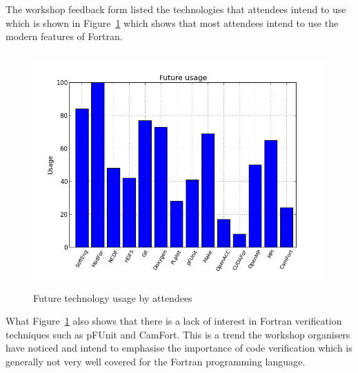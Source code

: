 \documentclass[12pt]{article}
\begin{document}
The workshop feedback form listed the technologies that attendees intend to use which is shown in Figure~\ref{future:png}
which shows that most attendees intend to use the modern features of Fortran.
\begin{figure}[H]
\begin{center}
\includegraphics[width=13cm,height=9cm]{future.png}
\caption{Future technology usage by attendees}\label{future:png}
\end{center}
\end{figure}
What Figure~\ref{future:png} also shows that there is a lack of interest in Fortran verification techniques such as
pFUnit and CamFort. This is a trend the workshop organisers have noticed and intend to emphasise the importance
of code verification which is generally not very well covered for the Fortran programming language. 
\end{document}
